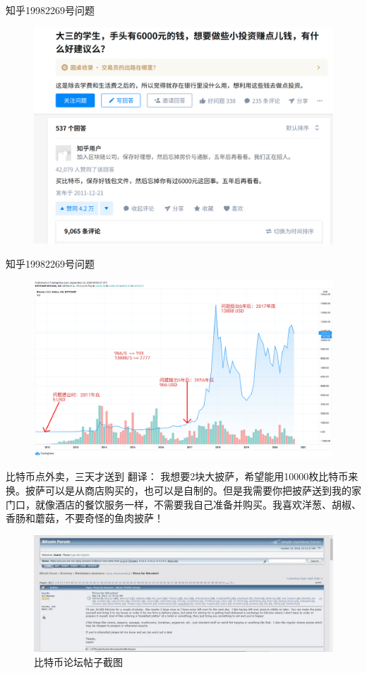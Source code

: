 \documentclass[11pt]{beamer}
\begin{document}
\begin{frame}{知乎19982269号问题}
	\begin{figure}
		\centering
		\includegraphics[width=0.8\linewidth]{figures/zhihu19982269}
		\label{fig:zhihu19982269}
	\end{figure}
\end{frame}

\begin{frame}{知乎19982269号问题}
	\begin{figure}
		\centering
		\includegraphics[width=\linewidth]{figures/btc6000}
		\label{fig:zhihu19982269}
	\end{figure}
\end{frame}

\begin{frame}{比特币点外卖，三天才送到}
	翻译： 我想要2块大披萨，希望能用10000枚比特币来换。披萨可以是从商店购买的，也可以是自制的。但是我需要你把披萨送到我的家门口，就像酒店的餐饮服务一样，不需要我自己准备并购买。我喜欢洋葱、胡椒、香肠和蘑菇，不要奇怪的鱼肉披萨！
	\begin{figure}
		\centering
		\includegraphics[width=0.7\linewidth]{figures/pizzabbs}
		\caption{比特币论坛帖子截图}
		\label{fig:pizzabbs}
	\end{figure}
\end{frame}
\end{document}
